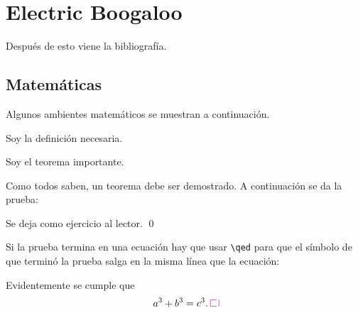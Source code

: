 \chapter{Electric Boogaloo}

\noindent Después de esto viene la bibliografía.

\section{Matemáticas}

\noindent Algunos ambientes matemáticos se muestran a continuación.

\begin{defn}
    Soy la definición necesaria.
\end{defn}

\begin{thm}
    Soy el teorema importante.
\end{thm}

Como todos saben, un teorema debe ser demostrado. A continuación se da la prueba:

\Proof
    Se deja como ejercicio al lector. \qed


Si la prueba termina en una ecuación hay que usar \texttt{\textbackslash{}qed} para que el símbolo de que terminó la prueba salga en la misma línea que la ecuación:

\Proof
    Evidentemente se cumple que 
    \[
        a^3 + b^3 = c^3. \qed
    \]
